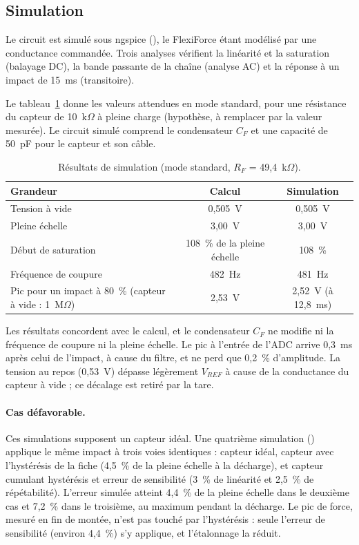 \subsection{Simulation}

Le circuit est simulé sous ngspice (), le FlexiForce étant modélisé par une conductance commandée. Trois analyses vérifient la linéarité et la saturation (balayage DC), la bande passante de la chaîne (analyse AC) et la réponse à un impact de 15~ms (transitoire).

Le tableau~\ref{tab:simu} donne les valeurs attendues en mode standard, pour une résistance du capteur de 10~k$\Omega$ à pleine charge (hypothèse, à remplacer par la valeur mesurée). Le circuit simulé comprend le condensateur $C_F$ et une capacité de 50~pF pour le capteur et son câble.

\begin{table}[H]
\centering
\begin{tabular}{@{}lcc@{}}
\toprule
\textbf{Grandeur} & \textbf{Calcul} & \textbf{Simulation} \\
\midrule
Tension à vide & 0,505~V & 0,505~V \\
Pleine échelle & 3,00~V & 3,00~V \\
Début de saturation & 108~\% de la pleine échelle & 108~\% \\
Fréquence de coupure & 482~Hz & 481~Hz \\
Pic pour un impact à 80~\% (capteur à vide : 1~M$\Omega$) & 2,53~V & 2,52~V (à 12,8~ms) \\
\bottomrule
\end{tabular}
\caption{Résultats de simulation (mode standard, $R_F$ = 49,4~k$\Omega$).}
\label{tab:simu}
\end{table}

Les résultats concordent avec le calcul, et le condensateur $C_F$ ne modifie ni la fréquence de coupure ni la pleine échelle. Le pic à l'entrée de l'ADC arrive 0,3~ms après celui de l'impact, à cause du filtre, et ne perd que 0,2~\% d'amplitude. La tension au repos (0,53~V) dépasse légèrement $V_{REF}$ à cause de la conductance du capteur à vide ; ce décalage est retiré par la tare.

\paragraph{Cas défavorable.} Ces simulations supposent un capteur idéal. Une quatrième simulation () applique le même impact à trois voies identiques : capteur idéal, capteur avec l'hystérésis de la fiche (4,5~\% de la pleine échelle à la décharge), et capteur cumulant hystérésis et erreur de sensibilité (3~\% de linéarité et 2,5~\% de répétabilité). L'erreur simulée atteint 4,4~\% de la pleine échelle dans le deuxième cas et 7,2~\% dans le troisième, au maximum pendant la décharge. Le pic de force, mesuré en fin de montée, n'est pas touché par l'hystérésis : seule l'erreur de sensibilité (environ 4,4~\%) s'y applique, et l'étalonnage la réduit.

